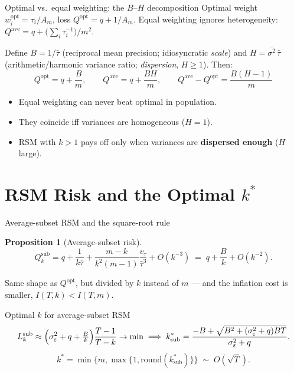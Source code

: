 \documentclass[11pt,aspectratio=169]{beamer}
\newcommand{\Qopt}{Q^{\mathrm{opt}}}
\newcommand{\Qave}{Q^{\mathrm{ave}}}
\newcommand{\Qsub}{Q_k^{\mathrm{sub}}}
\newcommand{\Lsub}{L_k^{\mathrm{sub}}}
\newtheorem{propositionX}{Proposition}
\begin{document}
\begin{frame}{Optimal vs.\ equal weighting: the $B$--$H$ decomposition}
  Optimal weight $w_i^{\mathrm{opt}}=\tau_i/A_m$, loss $\Qopt=q+1/A_m$.
  Equal weighting ignores heterogeneity:
  $\Qave=q+\bigl(\sum_i\tau_i^{-1}\bigr)/m^2$.

  Define $B=1/\bar\tau$ (reciprocal mean precision; idiosyncratic
  \emph{scale}) and $H=\overline{\sigma^2}\,\bar\tau$ (arithmetic/harmonic
  variance ratio; \emph{dispersion}, $H\ge1$). Then:
  \[
    \boxed{\;\Qopt=q+\frac{B}{m},\qquad
    \Qave=q+\frac{BH}{m},\qquad
    \Qave-\Qopt=\frac{B(H-1)}{m}\;}
  \]
  \begin{itemize}
    \item Equal weighting can never beat optimal in population.
    \item They coincide iff variances are homogeneous ($H=1$).
    \item RSM with $k>1$ pays off only when variances are
      \textbf{dispersed enough} ($H$ large).
  \end{itemize}
\end{frame}

\section{RSM Risk and the Optimal $k^*$}

\begin{frame}{Average-subset RSM and the square-root rule}
  \begin{propositionX}[Average-subset risk]
    \[
      \Qsub=q+\frac{1}{k\bar\tau}
        +\frac{m-k}{k^2(m-1)}\frac{v_\tau}{\bar\tau^3}+O(k^{-3})
      \;=\;q+\frac{B}{k}+O(k^{-2}).
    \]
  \end{propositionX}
  Same shape as $\Qopt$, but divided by $k$ instead of $m$ --- and the
  inflation cost is smaller, $I(T,k)<I(T,m)$.
  \begin{block}{Optimal $k$ for average-subset RSM}
    \[
      \Lsub\approx\Bigl(\sigma_\varepsilon^2+q+\tfrac{B}{k}\Bigr)\frac{T-1}{T-k}\to\min
      \;\Longrightarrow\;
      k_{\mathrm{sub}}^*=\frac{-B+\sqrt{B^2+(\sigma_\varepsilon^2+q)BT}}{\sigma_\varepsilon^2+q}.
    \]
    \[
      k^*=\min\{m,\max\{1,\mathrm{round}(k_{\mathrm{sub}}^*)\}\}
      \;\sim\;O(\sqrt{T}).
    \]
  \end{block}
\end{frame}
\end{document}
